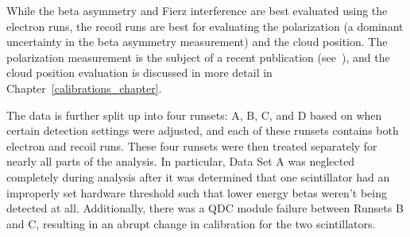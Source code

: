 While the beta asymmetry and Fierz interference are best evaluated using the electron runs, the recoil runs are best for evaluating the polarization (a dominant uncertainty in the beta asymmetry measurement) and the cloud position.  The polarization measurement is the subject of a recent publication (see~\cite{ben_OP}), and the cloud position evaluation is discussed in more detail in Chapter~\ref{calibrations_chapter}.

The data is further split up into four runsets:  A, B, C, and D based on when certain detection settings were adjusted, and each of these runsets contains both electron and recoil runs.  These four runsets were then treated separately for nearly all parts of the analysis.  In particular, Data Set A was neglected completely during analysis after it was determined that one scintillator had an improperly set hardware threshold such that lower energy betas weren't being detected at all.  Additionally, there was a QDC module failure between Runsets B and C, resulting in an abrupt change in calibration for the two scintillators.  






